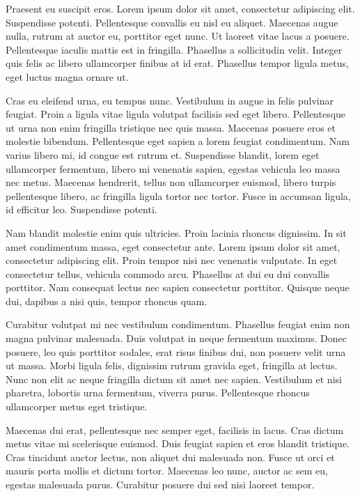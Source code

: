 \documentclass[a4paper,10pt,twoside]{article} %
\begin{document}
Praesent eu suscipit eros.
Lorem ipsum dolor sit amet, consectetur adipiscing elit.
Suspendisse potenti.
Pellentesque convallis eu nisl eu aliquet.
Maecenas augue nulla, rutrum at auctor eu, porttitor eget nunc.
Ut laoreet vitae lacus a posuere.
Pellentesque iaculis mattis est in fringilla.
Phasellus a sollicitudin velit.
Integer quis felis ac libero ullamcorper finibus at id erat.
Phasellus tempor ligula metus, eget luctus magna ornare ut.

Cras eu eleifend urna, eu tempus nunc.
Vestibulum in augue in felis pulvinar feugiat.
Proin a ligula vitae ligula volutpat facilisis sed eget libero.
Pellentesque ut urna non enim fringilla tristique nec quis massa.
Maecenas posuere eros et molestie bibendum.
Pellentesque eget sapien a lorem feugiat condimentum.
Nam varius libero mi, id congue est rutrum et.
Suspendisse blandit, lorem eget ullamcorper fermentum, libero mi venenatis sapien, egestas vehicula leo massa nec metus.
Maecenas hendrerit, tellus non ullamcorper euismod, libero turpis pellentesque libero, ac fringilla ligula tortor nec tortor.
Fusce in accumsan ligula, id efficitur leo.
Suspendisse potenti.

Nam blandit molestie enim quis ultricies.
Proin lacinia rhoncus dignissim.
In sit amet condimentum massa, eget consectetur ante.
Lorem ipsum dolor sit amet, consectetur adipiscing elit.
Proin tempor nisi nec venenatis vulputate.
In eget consectetur tellus, vehicula commodo arcu.
Phasellus at dui eu dui convallis porttitor.
Nam consequat lectus nec sapien consectetur porttitor.
Quisque neque dui, dapibus a nisi quis, tempor rhoncus quam.

Curabitur volutpat mi nec vestibulum condimentum.
Phasellus feugiat enim non magna pulvinar malesuada.
Duis volutpat in neque fermentum maximus.
Donec posuere, leo quis porttitor sodales, erat risus finibus dui, non posuere velit urna ut massa.
Morbi ligula felis, dignissim rutrum gravida eget, fringilla at lectus.
Nunc non elit ac neque fringilla dictum sit amet nec sapien.
Vestibulum et nisi pharetra, lobortis urna fermentum, viverra purus.
Pellentesque rhoncus ullamcorper metus eget tristique.

Maecenas dui erat, pellentesque nec semper eget, facilisis in lacus.
Cras dictum metus vitae mi scelerisque euismod.
Duis feugiat sapien et eros blandit tristique.
Cras tincidunt auctor lectus, non aliquet dui malesuada non.
Fusce ut orci et mauris porta mollis et dictum tortor.
Maecenas leo nunc, auctor ac sem eu, egestas malesuada purus.
Curabitur posuere dui sed nisi laoreet tempor.
\end{document}
